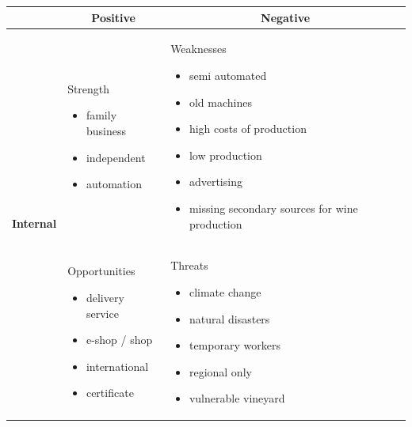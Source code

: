 \documentclass[11pt,a4paper]{article}
\begin{document}
\begin{table}[H]
  \begin{center}
    \begin{tabular}{r|p{}|p{}}
        & \multicolumn{1}{c|}{\textbf{\large{Positive}}} & \multicolumn{1}{c}{\textbf{\large{Negative}}}\\
        \hline

        \multirow{16}{*}[1em]{\textbf{\large{Internal}}}
        &
        \begin{center}
            Strength
        \end{center}
        \begin{itemize}
            \item family business
            \item independent
            \item automation
        \end{itemize}
        &
        \begin{center}
            Weaknesses
        \end{center}
        \begin{itemize}
            \item semi automated
            \item old machines
            \item high costs of production
            \item low production
            \item advertising
            \item missing secondary sources for wine production
        \end{itemize}
        \\
        \hline

        \multirow{14}{*}[1em]{\textbf{\large{External}}}
        &
        \begin{center}
            Opportunities
        \end{center}
        \begin{itemize}
            \item delivery service
            \item e-shop / shop
            \item international
            \item certificate
        \end{itemize}
        &
        \begin{center}
            Threats
        \end{center}
        \begin{itemize}
            \item climate change
            \item natural disasters
            \item temporary workers
            \item regional only
            \item vulnerable vineyard
        \end{itemize}
        \\
    \end{tabular}
  \end{center}
\end{table}
\end{document}
